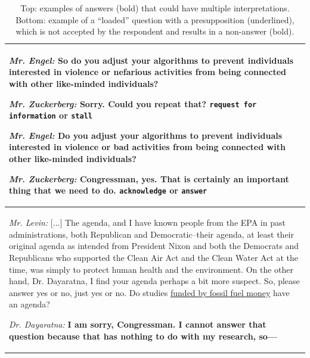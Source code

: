 \begin{table}[t]
    \centering
    \begin{tabular}{p{11cm}}
    \toprule
    \textit{Mr. Engel:} So do you adjust your algorithms to prevent individuals interested in violence or nefarious activities from being connected with other like-minded individuals?

\textit{Mr. Zuckerberg:} \textbf{Sorry. Could you repeat that?} \texttt{request for information} or \texttt{stall}

\textit{Mr. Engel:} Do you adjust your algorithms to prevent individuals interested in violence or bad activities from being connected with other like-minded individuals?

\textit{Mr. Zuckerberg:} \textbf{Congressman, yes. That is certainly an important thing that we need to do.} \texttt{acknowledge} or \texttt{answer}\\
\midrule
\textit{Mr. Levin:} [...] The agenda, and I have known people from the EPA in past administrations, both Republican and Democratic--their agenda, at least their original agenda as intended from President Nixon and both the Democrats and Republicans who supported the Clean Air Act and the Clean Water Act at the time, was simply to protect human health and the environment.    On the other hand, Dr. Dayaratna, I find your agenda perhaps a bit more suspect. So, please answer yes or no, just yes or no. Do studies \underline{funded by fossil fuel money} have an agenda?

\textit{Dr. Dayaratna:} \textbf{I am sorry, Congressman. I cannot answer that question because that has nothing to do with my research, so---}\\
    \bottomrule
    \end{tabular}
    \caption{Top: examples of answers (bold) that could have multiple interpretations. Bottom: example of a ``loaded'' question with a presupposition (underlined), which is not accepted by the respondent and results in a non-answer (bold).}
    \label{tab:example}
\end{table}


